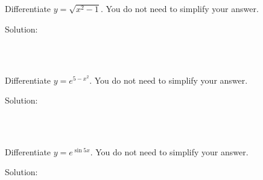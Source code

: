 \begin{mtask}
    \task \begin{exercise} Differentiate $y=\sqrt{x^2-1}$. You do not need to simplify your answer.\\
             \begin{envSolution}
			      Solution:
			      \begin{align*}
			           \quad\quad\quad                             \\[20pt]
                       \quad\quad\quad   \\[10pt]
					   \quad\quad\quad
				 \end{align*}
                 \begin{shortsolution}  
				       $ \quad\quad$
			     \end{shortsolution}				 
               \end{envSolution}
         \end{exercise}
    \task \begin{exercise} Differentiate $y=e^{5-x^2}$. You do not need to simplify your answer.\\
             \begin{envSolution}
			      Solution:
			      \begin{align*}
			           \quad\quad\quad                             \\[20pt]
                       \quad\quad\quad   \\[10pt]
					   \quad\quad\quad
				 \end{align*}
                 \begin{shortsolution}  
				       $ \quad\quad$
			     \end{shortsolution}				 
               \end{envSolution}
         \end{exercise}
    \task \begin{exercise} Differentiate $y=e^{\sin{5x}}$. You do not need to simplify your answer.\\
             \begin{envSolution}
			      Solution:
			      \begin{align*}
			           \quad\quad\quad                             \\[20pt]
                       \quad\quad\quad   \\[10pt]
					   \quad\quad\quad
				 \end{align*}
                 \begin{shortsolution}  
				       $ \quad\quad$
			     \end{shortsolution}				 
               \end{envSolution}
         \end{exercise}
\end{mtask}



